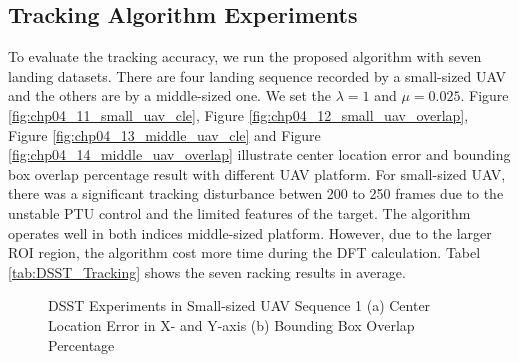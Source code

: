 \documentclass[journal,article,submit,moreauthors,pdftex,10pt,a4paper]{mdpi}
\begin{document}
\subsection{Tracking Algorithm Experiments}
To evaluate the tracking accuracy, we run the proposed algorithm with seven landing datasets. There are four landing sequence recorded by a small-sized UAV and the others are by a middle-sized one. We set the $\lambda=1$ and $\mu=0.025$. Figure \ref{fig:chp04_11_small_uav_cle}, Figure \ref{fig:chp04_12_small_uav_overlap}, Figure \ref{fig:chp04_13_middle_uav_cle} and Figure \ref{fig:chp04_14_middle_uav_overlap} illustrate center location error and bounding box overlap percentage result with different UAV platform. For small-sized UAV, there was a significant tracking disturbance betwen 200 to 250 frames due to the unstable PTU control and the limited features of the target. The algorithm operates well in both indices middle-sized platform. However, due to the larger ROI region, the algorithm cost more time during the DFT calculation. Tabel \ref{tab:DSST_Tracking} shows the seven racking results in average. 

\begin{figure}[!tb]
	\centering
	\caption{DSST Experiments in Small-sized UAV Sequence 1 (a) Center Location Error in X- and Y-axis  (b) Bounding Box Overlap Percentage}
\end{figure}
\end{document}
